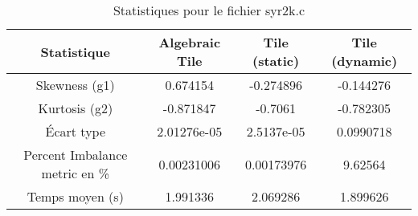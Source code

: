 \documentclass{article}
\begin{document}
\begin{table}[htbp]
  \centering
  \caption{Statistiques pour le fichier syr2k.c}
  \begin{tabular}{|c|c|c|c|}
    \hline
    Statistique & Algebraic Tile & Tile (static) & Tile (dynamic) \\ 
    \hline
    Skewness (g1) & 0.674154 & -0.274896 & -0.144276 \\ 
    Kurtosis (g2) & -0.871847 & -0.7061 & -0.782305 \\ 
    Écart type & 2.01276e-05 & 2.5137e-05 & 0.0990718\\ 
    Percent Imbalance metric en \% & 0.00231006 & 0.00173976 & 9.62564\\ 
    Temps moyen (s) & 1.991336 & 2.069286 & 1.899626 \\ 
    \hline
  \end{tabular}
\end{table}
\newpage
\end{document}
